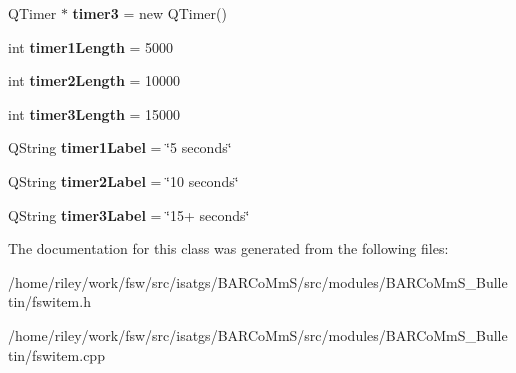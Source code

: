 \begin{DoxyCompactItemize}
\item 
Q\+Timer $\ast$ {\bfseries timer3} = new Q\+Timer()\hypertarget{class_f_s_w_item_a6064384f266ecacff16313d8de945f2a}{}\label{class_f_s_w_item_a6064384f266ecacff16313d8de945f2a}

\item 
int {\bfseries timer1\+Length} = 5000\hypertarget{class_f_s_w_item_aea0a9360998d04d7455e9efbee2a5099}{}\label{class_f_s_w_item_aea0a9360998d04d7455e9efbee2a5099}

\item 
int {\bfseries timer2\+Length} = 10000\hypertarget{class_f_s_w_item_a064330928c1e8265d90961b077995ebf}{}\label{class_f_s_w_item_a064330928c1e8265d90961b077995ebf}

\item 
int {\bfseries timer3\+Length} = 15000\hypertarget{class_f_s_w_item_aebcbc36e1d1e77f417c07b31585d93ab}{}\label{class_f_s_w_item_aebcbc36e1d1e77f417c07b31585d93ab}

\item 
Q\+String {\bfseries timer1\+Label} = \char`\"{}5 seconds\char`\"{}\hypertarget{class_f_s_w_item_a6e4e31323b974838181003d05709ebfa}{}\label{class_f_s_w_item_a6e4e31323b974838181003d05709ebfa}

\item 
Q\+String {\bfseries timer2\+Label} = \char`\"{}10 seconds\char`\"{}\hypertarget{class_f_s_w_item_a9ca97d850590fc36ccde80101626e6da}{}\label{class_f_s_w_item_a9ca97d850590fc36ccde80101626e6da}

\item 
Q\+String {\bfseries timer3\+Label} = \char`\"{}15+ seconds\char`\"{}\hypertarget{class_f_s_w_item_a0cf5f4881f02abf482a5a897f38dd061}{}\label{class_f_s_w_item_a0cf5f4881f02abf482a5a897f38dd061}

\end{DoxyCompactItemize}


The documentation for this class was generated from the following files\+:\begin{DoxyCompactItemize}
\item 
/home/riley/work/fsw/src/isatgs/\+B\+A\+R\+Co\+Mm\+S/src/modules/\+B\+A\+R\+Co\+Mm\+S\+\_\+\+Bulletin/fswitem.\+h\item 
/home/riley/work/fsw/src/isatgs/\+B\+A\+R\+Co\+Mm\+S/src/modules/\+B\+A\+R\+Co\+Mm\+S\+\_\+\+Bulletin/fswitem.\+cpp\end{DoxyCompactItemize}
